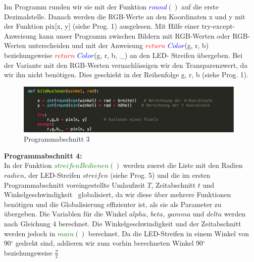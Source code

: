 \documentclass [a4paper, 11pt] {article}
\begin{document}
Im Programm runden wir sie mit der Funktion \textcolor{blue}{$round$}{$()$} auf die erste Dezimalstelle. Danach werden die RGB-Werte an den Koordinaten x und y mit der Funktion pix[x, y] (siehe Prog. 1) ausgelesen. Mit Hilfe einer try-except-Anweisung kann unser Programm zwischen Bildern mit RGB-Werten oder RGB\textalpha -Werten unterscheiden und mit der Anweisung \textcolor{red}{$return$} \textcolor{blue}{$Color$}(g, r, b) beziehungsweise \textcolor{red}{$return$} \textcolor{blue}{$Color$}(g, r, b, \_) an den LED- Streifen übergeben. Bei der Variante mit den RGB\textalpha -Werten vernachlässigen wir den Transparenzwert, da wir ihn nicht benötigen. Dies geschieht in der Reihenfolge g, r, b (siehe Prog. 1).
\begin{figure}[H]
	\centering
	\includegraphics[width=16cm]{P4.png}
	\caption{Programmabschnitt 3}
\end{figure}
\textbf{\large Programmabschnitt 4:}\\
In der Funktion \textcolor{green}{$streifenBedienen$}{$()$} werden zuerst die Liste mit den Radien {$radien$}, der LED-Streifen {$streifen$} (siehe Prog. 5) und die im ersten Programmabschnitt voreingestellte Umlaufzeit {$T$}, Zeitabschnitt {$t$} und Winkelgeschwindigkeit \textomega\ globalisiert, da wir diese über mehrere Funktionen benötigen und die Globalisierung effizienter ist, als sie als Parameter zu übergeben. Die Variablen für die Winkel $alpha,\ beta,\ gamma$ und $delta$ werden nach Gleichung 4 berechnet. Die Winkelgeschwindigkeit und der Zeitabschnitt werden jedoch in \textcolor{green}{$main$}{$()$} berechnet. Da die LED-Streifen in einem Winkel von 90$^\circ$ gedreht sind, addieren wir zum vorhin berechneten Winkel 90$^\circ$ beziehungsweise
$\frac{\pi}{2}$
\end{document}
